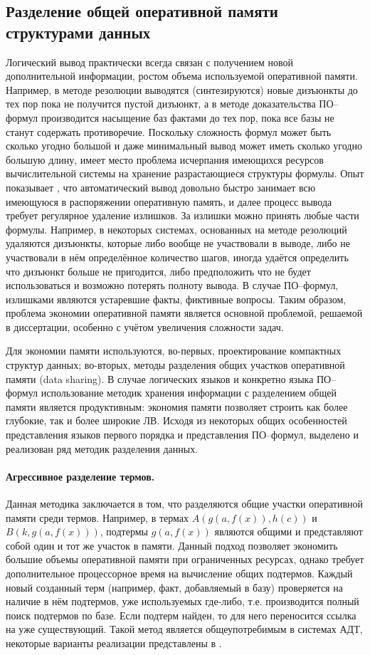 \subsection{Разделение общей оперативной памяти структурами данных}
Логический вывод практически всегда связан с получением новой дополнительной информации, ростом объема используемой оперативной памяти. Например, в методе резолюции выводятся (синтезируются) новые дизъюнкты до тех пор пока не получится пустой дизъюнкт, а в методе доказательства ПО--формул производится насыщение баз фактами до тех пор, пока все базы не станут содержать противоречие. Поскольку сложность формул может быть сколько угодно большой и даже минимальный вывод может иметь сколько угодно большую длину, имеет место проблема исчерпания имеющихся ресурсов вычислительной системы на хранение разрастающиеся структуры формулы. Опыт показывает \cite{TermIndexingBook}, что автоматический вывод довольно быстро занимает всю имеющуюся в распоряжении оперативную память, и далее процесс вывода требует регулярное удаление излишков. За излишки можно принять любые части формулы. Например, в некоторых системах, основанных на методе резолюций удаляются дизъюнкты, которые либо вообще не участвовали в выводе, либо не участвовали в нём определённое количество шагов, иногда удаётся определить что дизъюнкт больше не пригодится, либо предположить что не будет использоваться и возможно потерять полноту вывода. В случае ПО--формул, излишками являются устаревшие факты, фиктивные вопросы. Таким образом, проблема экономии оперативной памяти является основной проблемой, решаемой в диссертации, особенно с учётом увеличения сложности задач.

Для экономии памяти используются, во-первых, проектирование компактных структур данных; во-вторых, методы разделения общих участков оперативной памяти (data sharing). В случае логических языков и конкретно языка ПО--формул использование методик хранения информации с разделением общей памяти является продуктивным: экономия памяти позволяет строить как более глубокие, так и более широкие ЛВ. Исходя из некоторых общих особенностей представления языков первого порядка и представления ПО--формул, выделено и реализован ряд методик разделения данных.


\paragraph{Агрессивное разделение термов.} Данная методика заключается в том, что разделяются общие участки оперативной памяти среди термов. Например, в термах $A(g(a,f(x)),h(c))$ и $B(k,g(a,f(x)))$, подтермы $g(a,f(x))$ являются общими и представляют собой один и тот же участок в памяти. Данный подход позволяет экономить большие объемы оперативной памяти при ограниченных ресурсах, однако требует дополнительное процессорное время на вычисление общих подтермов. Каждый новый созданный терм (например, факт, добавляемый в базу) проверяется на наличие в нём подтермов, уже используемых где-либо, т.е. производится полный поиск подтермов по базе. Если подтерм найден, то для него переносится ссылка на уже существующий. Такой метод является общеупотребимым в системах АДТ, некоторые варианты реализации представлены в \cite{Ryazanov2003}.

